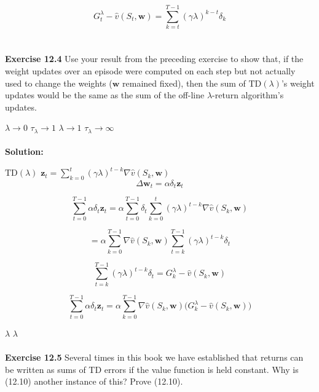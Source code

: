 \documentclass{article}
\begin{document}
\[
\boxed{G_t^\lambda - \hat{v}(S_t,\mathbf{w}) = \sum_{k=t}^{T-1}(\gamma\lambda)^{k-t}\delta_k}
\]
\\\\
\textbf{Exercise 12.4} \quad Use your result from the preceding exercise to show that, if the 
weight updates over an episode were computed on each step but not actually used to change 
the weights ($\mathbf{w}$ remained fixed), then the sum of $\text{TD}(\lambda)$'s weight updates would be 
the same as the sum of the off-line $\lambda$-return algorithm's updates.

 $\lambda \to 0$\text{, } $\tau_\lambda \to 1$ 
 $\lambda \to 1$\text{, } $\tau_\lambda \to \infty$ 
\\
\\

\textbf{Solution:}

 $\text{TD}(\lambda)$  
$\mathbf{z}_t = \sum_{k=0}^{t}(\gamma\lambda)^{t-k}\nabla\hat{v}(S_k,\mathbf{w})$ 
\[
\Delta\mathbf{w}_t = \alpha\delta_t\mathbf{z}_t
\]

\[
\sum_{t=0}^{T-1}\alpha\delta_t\mathbf{z}_t 
= \alpha\sum_{t=0}^{T-1}\delta_t\sum_{k=0}^{t}(\gamma\lambda)^{t-k}\nabla\hat{v}(S_k,\mathbf{w})
\]

\[
= \alpha\sum_{k=0}^{T-1}\nabla\hat{v}(S_k,\mathbf{w})\sum_{t=k}^{T-1}(\gamma\lambda)^{t-k}\delta_t
\]

\[
\sum_{t=k}^{T-1}(\gamma\lambda)^{t-k}\delta_t = G_k^\lambda - \hat{v}(S_k,\mathbf{w})
\]

\[
\boxed{\sum_{t=0}^{T-1}\alpha\delta_t\mathbf{z}_t 
= \alpha\sum_{k=0}^{T-1}\nabla\hat{v}(S_k,\mathbf{w})\bigl(G_k^\lambda - \hat{v}(S_k,\mathbf{w})\bigr)}
\]

 $\lambda$
 $\lambda$
\\\\
\textbf{Exercise 12.5} \quad Several times in this book we have established that returns 
can be written as sums of TD errors if the value function is held constant. Why is (12.10) 
another instance of this? Prove (12.10).
\\
\\
\end{document}
